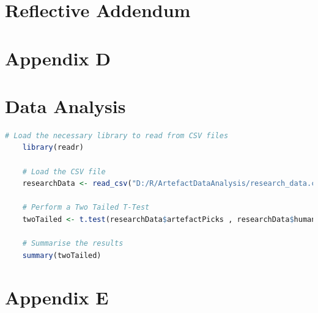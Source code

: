 \section*{Reflective Addendum}
\label{append:C}


\newpage
\section*{Appendix D}
\section*{Data Analysis}
\label{append:d}
\begin{lstlisting}[language=R, caption = Example R code for a Two Tailed T-Test using data from an imported CSV file]
    # Load the necessary library to read from CSV files
    library(readr)

    # Load the CSV file
    researchData <- read_csv("D:/R/ArtefactDataAnalysis/research_data.csv")

    # Perform a Two Tailed T-Test
    twoTailed <- t.test(researchData$artefactPicks , researchData$humanPicks)

    # Summarise the results
    summary(twoTailed)
\end{lstlisting}


\newpage
\section*{Appendix E}
